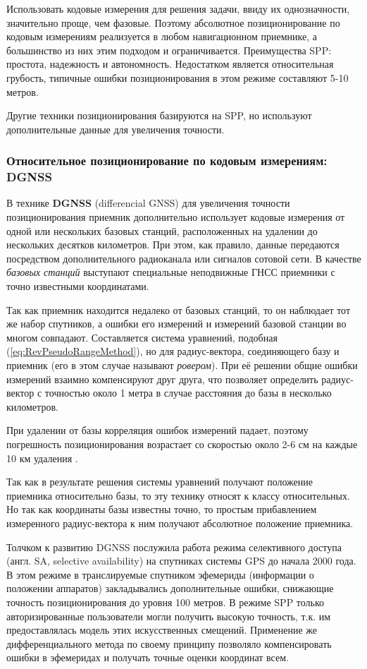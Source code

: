 Использовать кодовые измерения для решения задачи, ввиду их однозначности, значительно проще, чем фазовые. 
Поэтому абсолютное позиционирование по кодовым измерениям реализуется в любом навигационном приемнике, а большинство из них этим подходом и ограничивается. 
Преимущества SPP: простота, надежность и автономность. 
Недостатком является относительная грубость, типичные ошибки позиционирования в этом режиме составляют 5-10 метров. 

Другие техники позиционирования базируются на SPP, но используют дополнительные данные для увеличения точности. 

\subsubsection{Относительное позиционирование по кодовым измерениям: DGNSS}

В технике \textbf{DGNSS} (differencial GNSS) для увеличения точности позиционирования приемник дополнительно использует кодовые измерения от одной или нескольких базовых станций, расположенных на удалении до нескольких десятков километров.
При этом, как правило, данные передаются посредством дополнительного радиоканала или сигналов сотовой сети. 
В качестве \textit{базовых станций} выступают специальные неподвижные ГНСС приемники с точно известными координатами. 

Так как приемник находится недалеко от базовых станций, то он наблюдает тот же набор спутников, а ошибки его измерений и измерений базовой станции во многом совпадают. 
Составляется система уравнений, подобная (\ref{eq:RevPseudoRangeMethod}), но для радиус-вектора, соединяющего базу и приемник (его в этом случае называют \textit{ровером}).
При её решении общие ошибки измерений взаимно компенсируют друг друга, что позволяет определить радиус-вектор с точностью около 1 метра в случае расстояния до базы в несколько километров. 

При удалении от базы корреляция ошибок измерений падает, поэтому погрешность позиционирования возрастает со скоростью около 2-6 см на каждые 10 км удаления \cite{federalRadionavigationPlan2001, monteiro2005}. 

Так как в результате решения системы уравнений получают положение приемника относительно базы, то эту технику относят к классу относительных. 
Но так как координаты базы известны точно, то простым прибавлением измеренного радиус-вектора к ним получают абсолютное положение приемника.

Толчком к развитию DGNSS послужила работа режима селективного доступа (англ. SA, selective availability) на спутниках системы GPS до начала 2000 года. 
В этом режиме в транслируемые спутником эфемериды (информации о положении аппаратов) закладывались дополнительные ошибки, снижающие точность позиционирования до уровня 100 метров. 
В режиме SPP только авторизированные пользователи могли получить высокую точность, т.к. им предоставлялась модель этих искусственных смещений. 
Применение же дифференциального метода по своему принципу позволяло компенсировать ошибки в эфемеридах и получать точные оценки координат всем.

